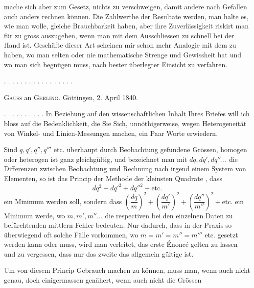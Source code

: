 mache sich aber zum Gesetz, nichts zu verschweigen, damit andere nach Gefallen auch anders
rechnen können. Die Zahlwerthe der Resultate werden, man halte es, wie man wolle, gleiche
Brauchbarkeit haben, aber ihre Zuverlässigkeit riskirt man für zu gross auszugeben, wenn man
mit dem Ausschliessen zu schnell bei der Hand ist. Geschäfte dieser Art scheinen mir schon
mehr Analogie mit dem  zu haben, wo man selten oder nie mathematische
Strenge und Gewissheit hat und wo man sich begnügen muss, nach bester überlegter Einsicht
zu verfahren.

\begin{center}
. . . . . . . . . . . . . . . . .
\end{center}



\begin{center}
\textsc{Gauss} an \textsc{Gerling}. Göttingen, 2. April 1840.
\end{center}

. . . . . . . . . . In Beziehung auf den wissenschaftlichen Inhalt Ihres Briefes will ich bloss auf die
Bedenklichkeit, die Sie Sich, unnöthigerweise, wegen Heterogeneität von Winkel- und
Linien-Messungen machen, ein Paar Worte erwiedern.

Sind $q, q', q'', q'''$ etc. überhaupt durch Beobachtung gefundene Grössen, homogen oder
heterogen ist ganz gleichgültig, und bezeichnet man mit $dq, dq', dq''\ldots$ die
Differenzen zwischen Beobachtung und Rechnung nach irgend einem System von Elementen, so
ist das Princip der Methode der kleinsten Quadrate , dass
\[
dq^2+dq'^2+dq''^2+\text{etc.}
\]
ein Minimum werden soll, sondern dass
$\left(\dfrac{dq}{m}\right)^2+\left(\dfrac{dq'}{m'}\right)^2+\left(\dfrac{dq''}{m''}\right)^2+$etc.
ein Minimum werde, wo $m, m', m''\ldots$ die respectiven bei den einzelnen Daten zu
befürchtenden mittlern Fehler bedeuten. Nur dadurch, dass in der Praxis so überwiegend oft
solche Fälle vorkommen, wo $m=m'=m''=m'''$ etc. gesetzt werden kann oder muss, wird man
verleitet, das erste Énoncé gelten zu lassen und zu vergessen, dass nur das zweite das
allgemein gültige ist.

Um von diesem Princip Gebrauch machen zu können, muss man, wenn auch nicht genau, doch
einigermassen genähert, wenn auch nicht die Grössen
